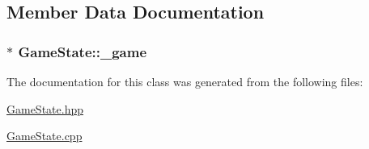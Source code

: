 \subsection{Member Data Documentation}
\hypertarget{classGameState_a66959f61db56d0eee7b29da271650920}{
\subsubsection[{\-\_\-game}]{$\ast$ Game\-State\-::\-\_\-game\hspace{0.3cm}{\ttfamily [protected]}}}\label{classGameState_a66959f61db56d0eee7b29da271650920}


The documentation for this class was generated from the following files\-:\begin{DoxyCompactItemize}
\item 
\hyperlink{GameState_8hpp}{Game\-State.\-hpp}\item 
\hyperlink{GameState_8cpp}{Game\-State.\-cpp}\end{DoxyCompactItemize}
